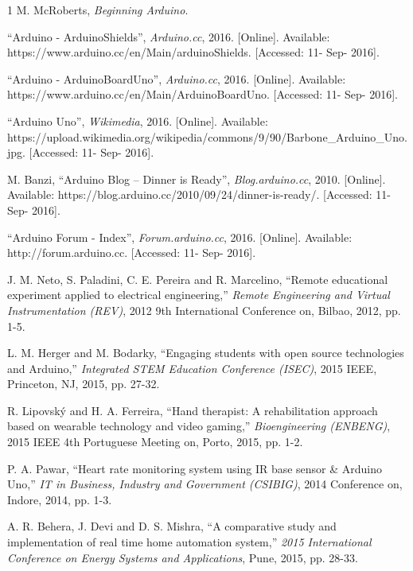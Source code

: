 \documentclass[11pt,letterpaper,twocolumn]{article}
\begin{document}
\begin{thebibliography}{1}
     M. McRoberts, {\it Beginning Arduino}.

     ``Arduino - ArduinoShields'', {\it Arduino.cc}, 2016. [Online]. Available: https://www.arduino.cc/en/Main/arduinoShields. [Accessed: 11- Sep- 2016].

     ``Arduino - ArduinoBoardUno'', {\it Arduino.cc}, 2016. [Online]. Available: https://www.arduino.cc/en/Main/ArduinoBoardUno. [Accessed: 11- Sep- 2016].

     ``Arduino Uno'', {\it Wikimedia}, 2016. [Online]. Available: https://upload.wikimedia.org/wikipedia/commons/9/90/Barbone\_Arduino\_Uno.jpg. [Accessed: 11- Sep- 2016].

     M. Banzi, ``Arduino Blog – Dinner is Ready'', {\it Blog.arduino.cc}, 2010. [Online]. Available: https://blog.arduino.cc/2010/09/24/dinner-is-ready/. [Accessed: 11- Sep- 2016].

     ``Arduino Forum - Index'', {\it Forum.arduino.cc}, 2016. [Online]. Available: http://forum.arduino.cc. [Accessed: 11- Sep- 2016].

     J. M. Neto, S. Paladini, C. E. Pereira and R. Marcelino, ``Remote educational experiment applied to electrical engineering,'' {\it Remote Engineering and Virtual Instrumentation (REV)}, 2012 9th International Conference on, Bilbao, 2012, pp. 1-5.

     L. M. Herger and M. Bodarky, ``Engaging students with open source technologies and Arduino,'' {\it Integrated STEM Education Conference (ISEC)}, 2015 IEEE, Princeton, NJ, 2015, pp. 27-32.

     R. Lipovský and H. A. Ferreira, ``Hand therapist: A rehabilitation approach based on wearable technology and video gaming,'' {\it Bioengineering (ENBENG)}, 2015 IEEE 4th Portuguese Meeting on, Porto, 2015, pp. 1-2.

     P. A. Pawar, ``Heart rate monitoring system using IR base sensor \& Arduino Uno,'' {\it IT in Business, Industry and Government (CSIBIG)}, 2014 Conference on, Indore, 2014, pp. 1-3.

     A. R. Behera, J. Devi and D. S. Mishra, ``A comparative study and implementation of real time home automation system,'' {\it 2015 International Conference on Energy Systems and Applications}, Pune, 2015, pp. 28-33.
\end{thebibliography}
\end{document}
